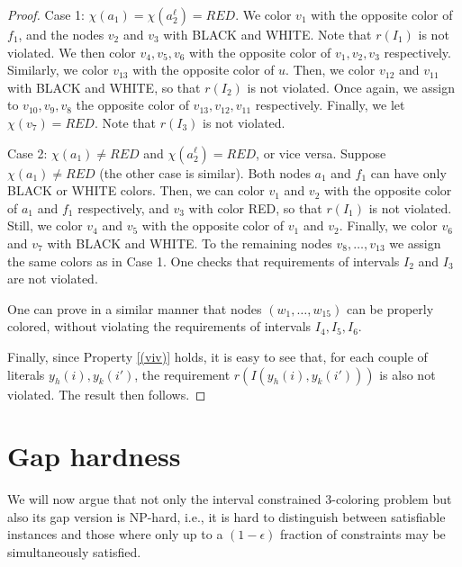 \documentclass[a4paper,11pt]{article}
\theoremstyle{theorem}
\begin{document}
\begin{proof}
Case 1: $\chi(a_1) = \chi(a_2^{\ell}) = RED$. We color $v_1$ with the opposite color of $f_1$, and the nodes $v_2$ and $v_3$ with BLACK and WHITE. Note that $r(I_1)$ is not violated. We then color $v_4,v_5,v_6$ with the opposite color of $v_1,v_2,v_3$ respectively. 
Similarly, we color $v_{13}$ with the opposite color of $u$. Then, we color $v_{12}$ and $v_{11}$ with BLACK and WHITE, so that $r(I_2)$ is not violated.  
Once again, we assign to $v_{10},v_9,v_8$ the opposite color of $v_{13},v_{12},v_{11}$ respectively. Finally, we let $\chi(v_7) = RED$. Note that $r(I_3)$ is not violated.

Case 2: $\chi(a_1) \neq RED$ and $\chi(a_2^{\ell}) = RED$, or vice versa. Suppose $\chi(a_1) \neq RED$ (the other case is similar). Both nodes $a_1$ and $f_1$ can have only BLACK or WHITE colors. Then, we can color $v_1$ and $v_2$ with the opposite color of $a_1$ and $f_1$ respectively, and $v_3$ with color RED, so that $r(I_1)$ is not violated. Still, we color
$v_4$ and $v_5$ with the opposite color of $v_1$ and $v_2$. Finally, we color $v_6$ and $v_7$ with BLACK and WHITE. To the remaining nodes $v_8, \dots, v_{13}$ we assign the same colors as in Case 1. One checks that requirements of intervals $I_2$ and $I_3$ are not violated. 

One can prove in a similar manner that nodes $(w_1, \dots, w_{15})$ can be properly colored, without violating the requirements of intervals $I_4,I_5,I_6$. 


\smallskip
Finally, since Property \eqref{(viv)} holds, it is easy to see that, for each couple of literals $y_h(i), y_k(i')$, the requirement $r(I(y_h(i), y_k(i')))$ is also not violated. The result then follows.

 




\end{proof}


\section{Gap hardness}

We will now argue that not only the interval constrained 3-coloring problem
but also its gap version is NP-hard, i.e., it is hard to distinguish between
satisfiable instances and those where only up to a $(1-\epsilon)$ fraction
of constraints may be simultaneously satisfied.
\end{document}
